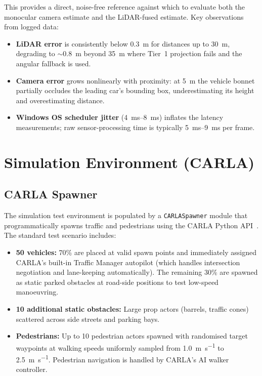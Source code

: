 \documentclass[12pt,a4paper]{article}
\begin{document}
This provides a direct, noise-free reference against which to evaluate both
the monocular camera estimate and the LiDAR-fused estimate.  Key observations
from logged data:
\begin{itemize}[nosep]
  \item \textbf{LiDAR error} is consistently below \SI{0.3}{\metre} for
        distances up to \SI{30}{\metre}, degrading to $\sim$\SI{0.8}{\metre}
        beyond \SI{35}{\metre} where Tier~1 projection fails and the angular
        fallback is used.
  \item \textbf{Camera error} grows nonlinearly with proximity: at
        \SI{5}{\metre} the vehicle bonnet partially occludes the leading car's
        bounding box, underestimating its height and overestimating distance.
  \item \textbf{Windows OS scheduler jitter} (\SI{4}{\milli\second}--\SI{8}{\milli\second})
        inflates the latency measurements; raw sensor-processing time is
        typically \SI{5}{\milli\second}--\SI{9}{\milli\second} per frame.
\end{itemize}


\section{Simulation Environment (CARLA)}
\label{sec:carla}

\subsection{CARLA Spawner}
\label{subsec:spawner}

The simulation test environment is populated by a \texttt{CARLASpawner}
module that programmatically spawns traffic and pedestrians using the CARLA
Python API~\cite{dosovitskiy2017carla}.  The standard test scenario includes:

\begin{itemize}[nosep]
  \item \textbf{50 vehicles:} 70\% are placed at valid spawn points and
        immediately assigned CARLA's built-in Traffic Manager autopilot
        (which handles intersection negotiation and lane-keeping automatically).
        The remaining 30\% are spawned as static parked obstacles at road-side
        positions to test low-speed manoeuvring.
  \item \textbf{10 additional static obstacles:} Large prop actors (barrels,
        traffic cones) scattered across side streets and parking bays.
  \item \textbf{Pedestrians:} Up to 10 pedestrian actors spawned with
        randomised target waypoints at walking speeds uniformly sampled from
        \SI{1.0}{\metre\per\second} to \SI{2.5}{\metre\per\second}.
        Pedestrian navigation is handled by CARLA's AI walker controller.
\end{itemize}
\end{document}
